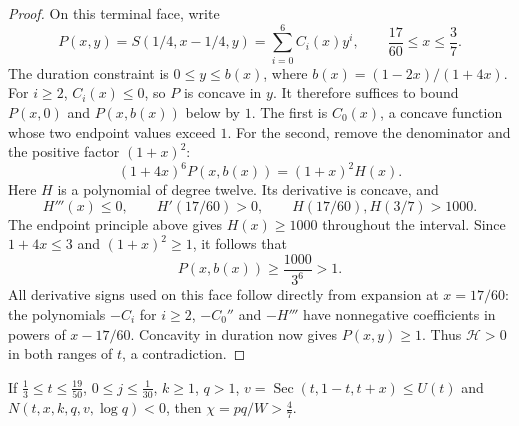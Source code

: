 \begin{proof}
On this terminal face, write
\[
 P(x,y)=S(1/4,x-1/4,y)=\sum_{i=0}^6 C_i(x)y^i,
 \qquad \frac{17}{60}\le x\le\frac37.
\]
The duration constraint is $0\le y\le b(x)$, where
$b(x)=(1-2x)/(1+4x)$.
For $i\ge2$, $C_i(x)\le0$, so $P$ is concave in $y$.
It therefore suffices to bound $P(x,0)$ and $P(x,b(x))$ below by $1$.
The first is $C_0(x)$, a concave function whose two endpoint values exceed $1$.
For the second, remove the denominator and the positive factor $(1+x)^2$:
\[
 (1+4x)^6P(x,b(x))=(1+x)^2H(x).
\]
Here $H$ is a polynomial of degree twelve. Its derivative is concave, and
\[
 H'''(x)\le0,\qquad H'(17/60)>0,\qquad
 H(17/60),H(3/7)>1000.
\]
The endpoint principle above gives $H(x)\ge1000$ throughout the interval.
Since $1+4x\le3$ and $(1+x)^2\ge1$, it follows that
\[
 P(x,b(x))\ge\frac{1000}{3^6}>1.
\]
All derivative signs used on this face follow directly from expansion at $x=17/60$:
the polynomials $-C_i$ for $i\ge2$, $-C_0''$ and $-H'''$ have nonnegative coefficients
in powers of $x-17/60$. Concavity in duration now gives $P(x,y)\ge1$.
Thus $\mathcal H>0$ in both ranges of $t$, a contradiction.
\end{proof}

\begin{lemma}\label{lem:m2-chi}
If $\frac13\le t\le\frac{19}{50}$, $0\le j\le\frac1{30}$, $k\ge1$, $q>1$,
$v=\operatorname{Sec}(t,1-t,t+x)\le U(t)$ and $N(t,x,k,q,v,\log q)<0$, then $\chi=pq/W>\frac47$.
\end{lemma}

